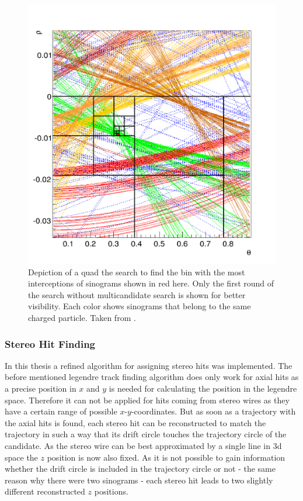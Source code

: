 \begin{figure}
  \centering
  \includegraphics[width=0.5\linewidth]{figures/theory/quad_tree.png}
  \caption[Quad tree search.]{Depiction of a quad the search to find the bin with the most interceptions of sinograms shown in red here. Only the first round of the search without multicandidate search is shown for better visibility. Each color shows sinograms that belong to the same charged particle. Taken from \cite{viktor_dpg}.}
  \label{fig-quad-tree-search}
\end{figure}


\subsubsection{Stereo Hit Finding}

In this thesis a refined algorithm for assigning stereo hits was implemented. The before mentioned legendre track finding algorithm does only work for axial hits as a precise position in $x$ and $y$ is needed for calculating the position in the legendre space. Therefore it can not be applied for hits coming from stereo wires as they have a certain range of possible $x$-$y$-coordinates. But as soon as a trajectory with the axial hits is found, each stereo hit can be reconstructed to match the trajectory in such a way that its drift circle touches the trajectory circle of the candidate. As the stereo wire can be best approximated by a single line in 3d space the $z$ position is now also fixed. As it is not possible to gain information whether the drift circle is included in the trajectory circle or not - the same reason why there were two sinograms - each stereo hit leads to two slightly different reconstructed $z$ positions. 

